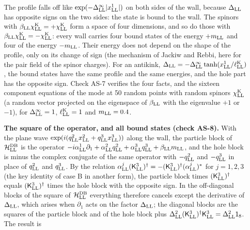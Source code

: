 \documentclass[
  10pt,
]{article}
\begin{document}
The profile falls off like
\(\exp(-\Delta^\infty_{\rm LL}\lvert x^1_{\rm LL}\rvert)\) on both sides
of the wall, because \(\Delta_{\rm LL}\) has opposite signs on the two
sides: the state is bound to the wall. The spinors with
\(\beta_{\rm LL}\chi^{\rm K}_{\rm LL}=+\chi^{\rm K}_{\rm LL}\) form a
space of four dimensions, and so do those with
\(\beta_{\rm LL}\chi^{\rm K}_{\rm LL}=-\chi^{\rm K}_{\rm LL}\): every
wall carries four bound states of the energy \(+m_{\rm LL}\) and four of
the energy \(-m_{\rm LL}\). Their energy does not depend on the shape of
the profile, only on its change of sign (the mechanism of Jackiw and
Rebbi, here for the pair field of the spinor charges). For an antikink,
\(\Delta_{\rm LL}=-\Delta^\infty_{\rm LL}\tanh(x^1_{\rm LL}/\ell^{\rm K}_{\rm LL})\),
the bound states have the same profile and the same energies, and the
hole part has the opposite sign. Check AS-7 verifies the four facts, and
the sixteen component equations of the mode at 50 random points with
random spinors \(\chi^{\rm K}_{\rm LL}\) (a random vector projected on
the eigenspace of \(\beta_{\rm LL}\) with the eigenvalue \(+1\) or
\(-1\)), for \(\Delta^\infty_{\rm LL}=1\), \(\ell^{\rm K}_{\rm LL}=1\)
and \(m_{\rm LL}=0.4\).

\textbf{The square of the operator, and all bound states (check AS-8).}
With the plane wave
\(\exp(i(q^2_{\rm LL}x^2_{\rm LL}+q^3_{\rm LL}x^3_{\rm LL}))\) along the
wall, the particle block of \(\mathcal H^{\rm DB}_{\rm LL}\) is the
operator
\(-i\alpha^1_{\rm LL}\partial_1+\alpha^2_{\rm LL}q^2_{\rm LL}+\alpha^3_{\rm LL}q^3_{\rm LL}+\beta_{\rm LL}m_{\rm LL}\),
and the hole block is minus the complex conjugate of the same operator
with \(-q^2_{\rm LL}\) and \(-q^3_{\rm LL}\) in place of
\(q^2_{\rm LL}\) and \(q^3_{\rm LL}\). By the relation
\(\alpha^j_{\rm LL}(\mathsf K^3_{\rm LL})^\dagger=-(\mathsf K^3_{\rm LL})^\dagger(\alpha^j_{\rm LL})^{*}\)
for \(j=1,2,3\) (the key identity of case B in another form), the
particle block times \((\mathsf K^3_{\rm LL})^\dagger\) equals
\((\mathsf K^3_{\rm LL})^\dagger\) times the hole block with the
opposite sign. In the off-diagonal blocks of the square of
\(\mathcal H^{\rm DB}_{\rm LL}\) everything therefore cancels except the
derivative of \(\Delta_{\rm LL}\), which arises when \(\partial_1\) acts
on the factor \(\Delta_{\rm LL}\); the diagonal blocks are the squares
of the particle block and of the hole block plus
\(\Delta_{\rm LL}^2(\mathsf K^3_{\rm LL})^\dagger\mathsf K^3_{\rm LL}=\Delta_{\rm LL}^2\mathsf 1_8\).
The result is
\end{document}
